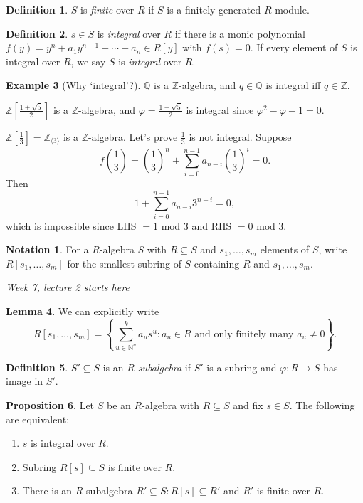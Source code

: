\documentclass[a4paper]{article}
\newcommand{\Mod}{\text{ mod }}
\theoremstyle{definition}
\newtheorem{defn}{Definition}[subsection]
\newtheorem{prop}[defn]{Proposition}
\newtheorem{lemma}[defn]{Lemma}
\newtheorem{example}[defn]{Example}
\newtheorem*{notation}{Notation}
\begin{document}
\begin{defn}
$S$ is \textit{finite} over $R$ if $S$ is a finitely generated $R$-module.
\end{defn}

\begin{defn}
$s\in S$ is \textit{integral} over $R$ if there is a monic polynomial $f(y)=y^n+a_1y^{n-1}+\cdots+a_n\in R[y]$ with $f(s)=0$. If every element of $S$ is integral over $R$, we say $S$ is \textit{integral} over $R$.
\end{defn}
\begin{example}[Why `integral'?]
$\mathbb Q$ is a $\mathbb Z$-algebra, and $q\in\mathbb Q$ is integral iff $q\in\mathbb Z$.

$\mathbb Z\left[\frac{1+\sqrt5}{2}\right]$ is a $\mathbb Z$-algebra, and $\varphi=\frac{1+\sqrt5}{2}$ is integral since $\varphi^2-\varphi-1=0$.

$\mathbb Z\left[\frac13\right]=\mathbb Z_{\langle3\rangle}$ is a $\mathbb Z$-algebra. Let's prove $\frac13$ is not integral. Suppose
\[
f\left(\frac13\right)=\left(\frac13\right)^n+\sum_{i=0}^{n-1} a_{n-i}\left(\frac13\right)^i=0.
\]
Then
\[
1+\sum_{i=0}^{n-1}a_{n-i}3^{n-i}=0,
\]
which is impossible since LHS $=1\Mod 3$ and RHS $=0\Mod 3$.
\end{example}

\begin{notation}
For a $R$-algebra $S$ with $R\subseteq S$ and $s_1,\ldots,s_m$ elements of $S$, write $R[s_1,\ldots,s_m]$ for the smallest subring of $S$ containing $R$ and $s_1,\ldots,s_m$.
\end{notation}

\begin{flushright}
\textit{Week 7, lecture 2 starts here}
\end{flushright}

\begin{lemma}
We can explicitly write
\[
R[s_1,\ldots,s_m]=\left\{ \sum_{u\in\mathbb N^n}^k a_u s^u:a_u\in R \text{ and only finitely many } a_u\neq 0\right\}.
\]
\end{lemma}

\begin{defn}
$S'\subseteq S$ is an $R$\textit{-subalgebra} if $S'$ is a subring and $\varphi:R\rightarrow S$ has image in $S'$.
\end{defn}

\begin{prop}
\label{prop:sintthenRsfinite}
Let $S$ be an $R$-algebra with $R\subseteq S$ and fix $s\in S$. The following are equivalent:
\begin{enumerate}
\item $s$ is integral over $R$.
\item Subring $R[s]\subseteq S$ is finite over $R$.
\item There is an $R$-subalgebra $R'\subseteq S:R[s]\subseteq R'$ and $R'$ is finite over $R$.
\end{enumerate}
\end{prop}
\end{document}
